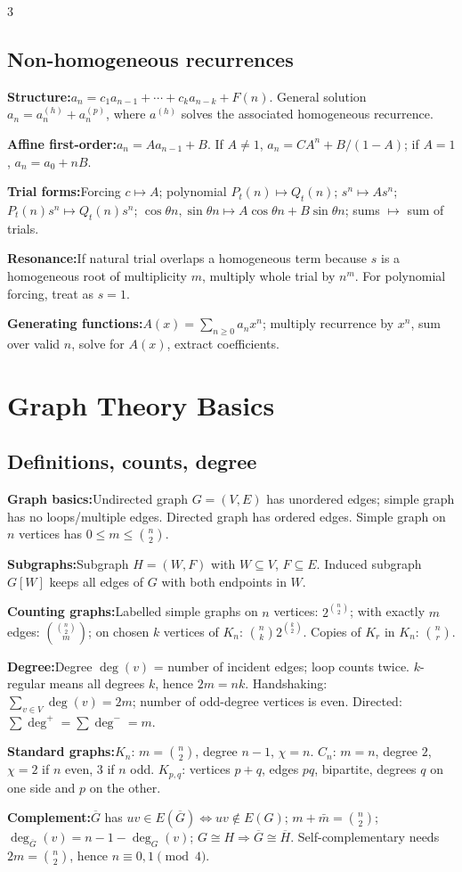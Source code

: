 \documentclass[10pt]{article}
\newenvironment{cheatitems}{\par\vspace{-1pt}}{\par\vspace{-1pt}}
\newcommand{\cheatrow}[2]{\par\noindent\textbf{#1:}\enspace #2\par}
\begin{document}
\begin{multicols}{3}
\subsection*{Non-homogeneous recurrences}
\begin{cheatitems}
\cheatrow{Structure}{$a_n=c_1a_{n-1}+\cdots+c_ka_{n-k}+F(n)$. General solution $a_n=a_n^{(h)}+a_n^{(p)}$, where $a^{(h)}$ solves the associated homogeneous recurrence.}
\cheatrow{Affine first-order}{$a_n=Aa_{n-1}+B$. If $A\ne1$, $a_n=CA^n+B/(1-A)$; if $A=1$, $a_n=a_0+nB$.}
\cheatrow{Trial forms}{Forcing $c\mapsto A$; polynomial $P_t(n)\mapsto Q_t(n)$; $s^n\mapsto As^n$; $P_t(n)s^n\mapsto Q_t(n)s^n$; $\cos\theta n,\sin\theta n\mapsto A\cos\theta n+B\sin\theta n$; sums $\mapsto$ sum of trials.}
\cheatrow{Resonance}{If natural trial overlaps a homogeneous term because $s$ is a homogeneous root of multiplicity $m$, multiply whole trial by $n^m$. For polynomial forcing, treat as $s=1$.}
\cheatrow{Generating functions}{$A(x)=\sum_{n\ge0}a_nx^n$; multiply recurrence by $x^n$, sum over valid $n$, solve for $A(x)$, extract coefficients.}
\end{cheatitems}

\section*{Graph Theory Basics}
\subsection*{Definitions, counts, degree}
\begin{cheatitems}
\cheatrow{Graph basics}{Undirected graph $G=(V,E)$ has unordered edges; simple graph has no loops/multiple edges. Directed graph has ordered edges. Simple graph on $n$ vertices has $0\le m\le\binom n2$.}
\cheatrow{Subgraphs}{Subgraph $H=(W,F)$ with $W\subseteq V$, $F\subseteq E$. Induced subgraph $G[W]$ keeps all edges of $G$ with both endpoints in $W$.}
\cheatrow{Counting graphs}{Labelled simple graphs on $n$ vertices: $2^{\binom n2}$; with exactly $m$ edges: $\binom{\binom n2}{m}$; on chosen $k$ vertices of $K_n$: $\binom nk2^{\binom k2}$. Copies of $K_r$ in $K_n$: $\binom nr$.}
\cheatrow{Degree}{Degree $\deg(v)$ = number of incident edges; loop counts twice. $k$-regular means all degrees $k$, hence $2m=nk$. Handshaking: $\sum_{v\in V}\deg(v)=2m$; number of odd-degree vertices is even. Directed: $\sum\deg^+=\sum\deg^-=m$.}
\cheatrow{Standard graphs}{$K_n$: $m=\binom n2$, degree $n-1$, $\chi=n$. $C_n$: $m=n$, degree $2$, $\chi=2$ if $n$ even, $3$ if $n$ odd. $K_{p,q}$: vertices $p+q$, edges $pq$, bipartite, degrees $q$ on one side and $p$ on the other.}
\cheatrow{Complement}{$\overline G$ has $uv\in E(\overline G)\iff uv\notin E(G)$; $m+\bar m=\binom n2$; $\deg_{\overline G}(v)=n-1-\deg_G(v)$; $G\cong H\Rightarrow\overline G\cong\overline H$. Self-complementary needs $2m=\binom n2$, hence $n\equiv0,1\pmod4$.}
\end{cheatitems}


\end{multicols}
\end{document}
